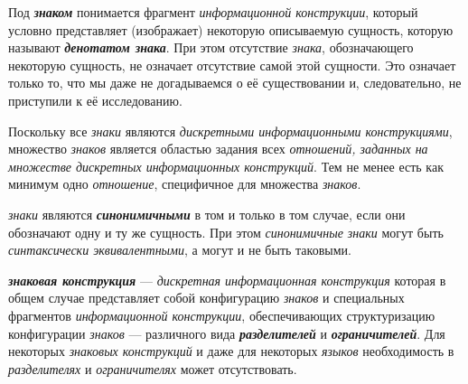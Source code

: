 Под \textbf{\textit{знаком}} понимается фрагмент \textit{информационной конструкции}, который условно представляет (изображает) некоторую описываемую сущность, которую называют \textbf{\textit{денотатом знака}}.
При этом отсутствие \textit{знака}, обозначающего некоторую сущность, не означает отсутствие самой этой сущности.
Это означает только то, что мы даже не догадываемся о её существовании и, следовательно, не приступили к её исследованию.

Поскольку все \textit{знаки} являются \textit{дискретными информационными конструкциями}, множество \textit{знаков} является областью задания всех \textit{отношений, заданных на множестве дискретных \textit{информационных конструкций}}.
Тем не менее есть как минимум одно \textit{отношение}, специфичное для множества \textit{знаков}.

\begin{SCn}


\end{SCn}

\textit{знаки} являются \textbf{\textit{синонимичными}} в том и только в том случае, если они обозначают одну и ту же сущность.
При этом \textit{синонимичные знаки} могут быть \textit{синтаксически эквивалентными}, а могут и не быть таковыми.

\begin{SCn}


\end{SCn}

\textbf{\textit{знаковая конструкция}} --- \textit{дискретная информационная конструкция} которая в общем случае представляет собой конфигурацию \textit{знаков} и специальных фрагментов \textit{информационной конструкции}, обеспечивающих структуризацию конфигурации \textit{знаков} --- различного вида \textbf{\textit{разделителей}} и \textbf{\textit{ограничителей}}.
Для некоторых \textit{знаковых конструкций} и даже для некоторых \textit{языков} необходимость в \textit{разделителях} и \textit{ограничителях} может отсутствовать.

\begin{SCn}

        \begin{scnindent}
        \end{scnindent}

\end{SCn}

